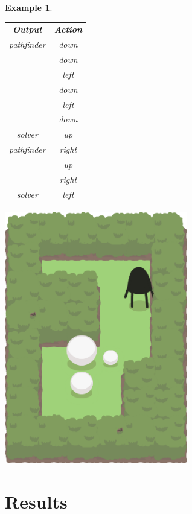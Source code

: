 \documentclass{report}
\theoremstyle{plain}
\newtheorem{example}{Example}[section]
\begin{document}
\begin{example}
\begin{minipage}{0.5\textwidth}
\centering
\begin{tabular}{c|c|}
    \cline{1-2}
    \multicolumn{1}{|c|}{\textbf{Output}} & \textbf{Action} \\
    \cline{1-2}
    \multicolumn{1}{|c|}{pathfinder} & down \\
    \cline{1-1}
     & down \\
     & left \\
     & down \\
     & left \\
     & down \\
    \cline{1-2}
    \multicolumn{1}{|c|}{solver} & up \\
    \cline{1-2}
    \multicolumn{1}{|c|}{pathfinder} & right \\
    \cline{1-1}
     & up \\
     & right \\
    \cline{1-2}
    \multicolumn{1}{|c|}{solver} & left \\
    \cline{1-2}
\end{tabular}
\end{minipage}
\begin{minipage}{0.5\textwidth}
\centering
\includegraphics[width=0.6\textwidth]{rebecca-1.png}
\end{minipage}
\end{example}

\chapter{Results}
\end{document}
